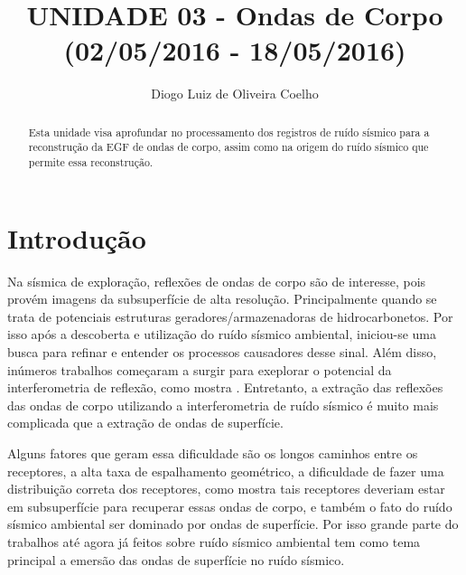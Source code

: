 \documentclass[paper,twocolumn]{geophysics}
\begin{document}
\title{{UNIDADE 03 - Ondas de Corpo (02/05/2016 - 18/05/2016)}}

\address{\footnotemark[1] Universidade Federal do Rio Grande do Norte - UFRN
Centro de Ciências Exatas e da Terra - CCET
Departamento de Geofísica
Campus Universitário - Lagoa Nova
59072-970 Natal, RN
}
\author{Diogo Luiz de Oliveira Coelho\footnotemark[1]}


\begin{abstract}
{Esta unidade visa aprofundar no processamento dos registros de ruído sísmico para a reconstrução da EGF de ondas de corpo, assim como na origem do ruído sísmico que permite essa reconstrução.}  
\end{abstract}

\section*{Introdução}
Na sísmica de exploração, reflexões de ondas de corpo são de interesse, pois provém imagens da subsuperfície de alta resolução. Principalmente quando se trata de  potenciais estruturas geradores/armazenadoras de hidrocarbonetos. Por isso após a descoberta e utilização do ruído sísmico ambiental, iniciou-se uma busca para refinar e entender os processos causadores desse sinal. Além disso, inúmeros trabalhos começaram a surgir para exeplorar o potencial da interferometria de reflexão, como mostra \cite{wapenaar_tutorial_2010}. Entretanto, a extração das reflexões das ondas de corpo utilizando a interferometria de ruído sísmico é muito mais complicada que a extração de ondas de superfície. 

Alguns fatores que geram essa dificuldade são os longos caminhos entre os receptores, a alta taxa de espalhamento geométrico, a dificuldade de fazer uma distribuição correta dos receptores, como mostra \cite{wapenaar_retrieving_2004} tais receptores deveriam estar em subsuperfície para recuperar essas ondas de corpo, e também o fato do ruído sísmico ambiental ser dominado por ondas de superfície. Por isso grande parte do trabalhos até agora já feitos sobre ruído sísmico ambiental tem como tema principal a emersão das ondas de superfície no ruído sísmico.
\end{document}
